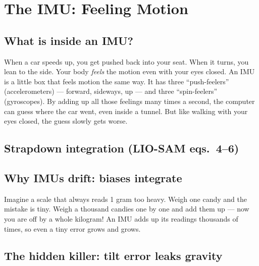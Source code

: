 \chapter{The IMU: Feeling Motion}

\section{What is inside an IMU?}

\begin{kid}
When a car speeds up, you get pushed back into your seat. When it turns, you lean to the side. Your body \emph{feels} the motion even with your eyes closed. An IMU is a little box that feels motion the same way. It has three ``push-feelers'' (accelerometers) --- forward, sideways, up --- and three ``spin-feelers'' (gyroscopes). By adding up all those feelings many times a second, the computer can guess where the car went, even inside a tunnel. But like walking with your eyes closed, the guess slowly gets worse.
\end{kid}


\section{Strapdown integration (LIO-SAM eqs.\ 4--6)}


\section{Why IMUs drift: biases integrate}

\begin{kid}
Imagine a scale that always reads 1 gram too heavy. Weigh one candy and the mistake is tiny. Weigh a thousand candies one by one and add them up --- now you are off by a whole kilogram! An IMU adds up its readings thousands of times, so even a tiny error grows and grows.
\end{kid}


\section{The hidden killer: tilt error leaks gravity}

